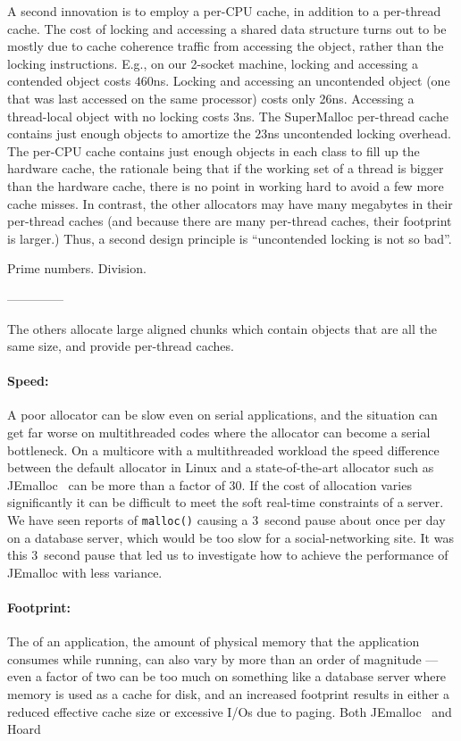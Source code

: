 \documentclass[pldi]{sigplanconf-pldi15}
\def\code{\lstinline[basicstyle=\ttfamily]}
\begin{document}
A second innovation is to employ a per-CPU cache, in addition to a
per-thread cache.  The cost of locking and accessing a shared data
structure turns out to be mostly due to cache coherence traffic from
accessing the object, rather than the locking instructions.  E.g., on
our 2-socket machine, locking and accessing a contended object costs
$460$ns.  Locking and accessing an uncontended object (one that was
last accessed on the same processor) costs only 26ns.  Accessing a
thread-local object with no locking costs $3$ns.  The SuperMalloc
per-thread cache contains just enough objects to amortize the $23$ns
uncontended locking overhead.  The per-CPU cache contains just enough
objects in each class to fill up the hardware cache, the rationale
being that if the working set of a thread is bigger than the hardware
cache, there is no point in working hard to avoid a few more cache
misses.  In contrast, the other allocators may have many megabytes in
their per-thread caches (and because there are many per-thread caches,
their footprint is larger.)  Thus, a second design principle is
``uncontended locking is not so bad''.

Prime numbers.  Division.

--------------

The others allocate large aligned chunks which contain objects that
are all the same size, and provide per-thread caches.


{\paragraph{Speed:}} A poor allocator can be slow even on serial
applications, and the situation can get far worse on multithreaded
codes where the allocator can become a serial bottleneck.  On a
multicore with a multithreaded workload the speed difference between
the default allocator in Linux \cite{Lea96} and a state-of-the-art
allocator such as JEmalloc~\cite{Evans06} can be more than a factor of
30.  If the cost of allocation varies significantly it can be
difficult to meet the soft real-time constraints of a server.  We have
seen reports of \code{malloc()} causing a 3~second pause about once
per day on a database server, which would be too slow for a
social-networking site.  It was this 3~second pause that led us to
investigate how to achieve the performance of JEmalloc with less
variance.

{\paragraph{Footprint:}} The  of an
application, the amount of physical memory that the application
consumes while running, can also vary by more than an order of
magnitude --- even a factor of two can be too much on something like a
database server where memory is used as a cache for disk, and an
increased footprint results in either a reduced effective cache size
or excessive I/Os due to paging.  Both JEmalloc~\cite{Evans06} and Hoard~\cite{BergerMcBl00} 
\end{document}
